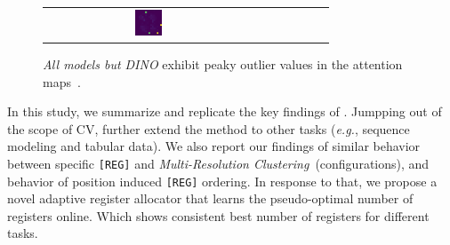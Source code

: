 \documentclass{article}
\newcommand{\RegTok}{\texttt{[REG]}\xspace}
\newcommand{\citet}{\textcite}
\newcommand{\citep}{\parencite}
\begin{document}
\begin{figure}[t]
{\begin{tabular}{c cc cc cc }
      \includegraphics[width=0.13\textwidth]{resources/230914_1202_fig2_vizs_various_models/vit_giant_patch14_dinov2.lvd142m_1753_lastattmap.png}
      \\
    \end{tabular}
    }
    \caption{
      \emph{All models but DINO} exhibit peaky outlier values in the attention maps~\cite{darcetVisionTransformersNeed2024}.
    }  
    \label{fig:allvits}
\end{figure}

In this study, we summarize and replicate the key findings of \citet{darcetVisionTransformersNeed2024}. Jumpping out of the scope of CV, further extend the method to other tasks (\emph{e.g.}, sequence modeling and tabular data). We also report our findings of similar behavior between specific \RegTok and \emph{Multi-Resolution Clustering}~(configurations), and behavior of position induced \RegTok ordering. In response to that, we propose a novel adaptive register allocator that learns the pseudo-optimal number of registers online. Which shows consistent best number of registers for different tasks.


\end{document}
